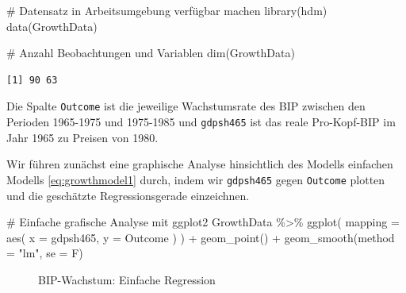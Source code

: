 \documentclass[
  a4paper,
  DIV=11,
  oneside]{scrreprt}
\newenvironment{Shaded}{\begin{snugshade}}{\end{snugshade}}
\newcommand{\AttributeTok}[1]{\textcolor[rgb]{0.40,0.45,0.13}{#1}}
\newcommand{\CommentTok}[1]{\textcolor[rgb]{0.37,0.37,0.37}{#1}}
\newcommand{\FunctionTok}[1]{\textcolor[rgb]{0.28,0.35,0.67}{#1}}
\newcommand{\NormalTok}[1]{\textcolor[rgb]{0.00,0.23,0.31}{#1}}
\newcommand{\SpecialCharTok}[1]{\textcolor[rgb]{0.37,0.37,0.37}{#1}}
\newcommand{\StringTok}[1]{\textcolor[rgb]{0.13,0.47,0.30}{#1}}
\begin{document}
\begin{Shaded}
\begin{Highlighting}[]
\CommentTok{\# Datensatz in Arbeitsumgebung verfügbar machen}
\FunctionTok{library}\NormalTok{(hdm)}
\FunctionTok{data}\NormalTok{(GrowthData)}

\CommentTok{\# Anzahl Beobachtungen und Variablen}
\FunctionTok{dim}\NormalTok{(GrowthData)}
\end{Highlighting}
\end{Shaded}

\begin{verbatim}
[1] 90 63
\end{verbatim}

Die Spalte \texttt{Outcome} ist die jeweilige Wachstumsrate des BIP
zwischen den Perioden 1965-1975 und 1975-1985 und \texttt{gdpsh465} ist
das reale Pro-Kopf-BIP im Jahr 1965 zu Preisen von 1980.

Wir führen zunächst eine graphische Analyse hinsichtlich des Modells
einfachen Modells \eqref{eq:growthmodel1} durch, indem wir
\texttt{gdpsh465} gegen \texttt{Outcome} plotten und die geschätzte
Regressionsgerade einzeichnen.

\begin{Shaded}
\begin{Highlighting}[]
\CommentTok{\# Einfache grafische Analyse mit ggplot2}
\NormalTok{GrowthData }\SpecialCharTok{\%\textgreater{}\%}
  \FunctionTok{ggplot}\NormalTok{(}
    \AttributeTok{mapping =} \FunctionTok{aes}\NormalTok{(}
      \AttributeTok{x =}\NormalTok{ gdpsh465, }
      \AttributeTok{y =}\NormalTok{ Outcome}
\NormalTok{    )}
\NormalTok{  ) }\SpecialCharTok{+}
  \FunctionTok{geom\_point}\NormalTok{() }\SpecialCharTok{+}
  \FunctionTok{geom\_smooth}\NormalTok{(}\AttributeTok{method =} \StringTok{"lm"}\NormalTok{, }\AttributeTok{se =}\NormalTok{ F)}
\end{Highlighting}
\end{Shaded}

\begin{figure}[t]


\caption{\label{fig-bipsimple}BIP-Wachstum: Einfache Regression}

\end{figure}%
\end{document}
